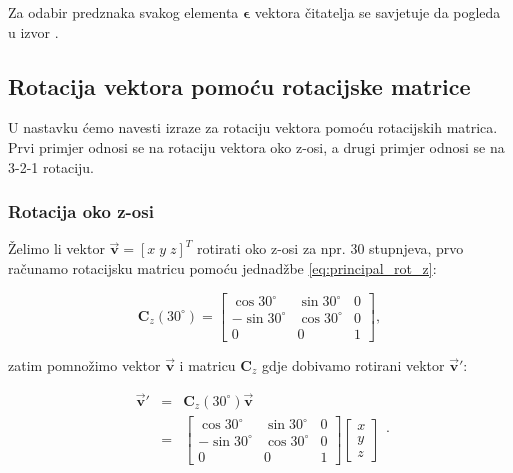 \documentclass[times, utf8, diplomski, numeric]{templates/template}
\begin{document}
{{{{                Za odabir predznaka svakog elementa $\boldsymbol\epsilon$ vektora čitatelja se savjetuje da pogleda u izvor \cite{adcsKnjiga}.
            }
        }

        \subsection{Rotacija vektora pomoću rotacijske matrice}{
            U nastavku ćemo navesti izraze za rotaciju vektora pomoću rotacijskih matrica. Prvi primjer odnosi se na rotaciju vektora oko z-osi, a drugi primjer odnosi se na 3-2-1 rotaciju.

            \subsubsection{Rotacija oko z-osi}{
                Želimo li vektor $\overrightarrow{\boldsymbol{v}}=\left[ x \; y \; z \right]^T$ rotirati oko z-osi za npr. 30 stupnjeva, prvo računamo rotacijsku matricu pomoću jednadžbe \ref{eq:principal_rot_z}:

                \begin{equation}
                \boldsymbol{C}_{z}(30^{\circ}) = 
                \begin{bmatrix}
                    \cos30^{\circ}   & \sin30^{\circ}    &  0 \\
                    -\sin30^{\circ}  & \cos30^{\circ}    &  0 \\
                    0                & 0                 &  1
                \end{bmatrix}
                ,
                \end{equation}

                zatim pomnožimo vektor $\overrightarrow{\boldsymbol{v}}$ i matricu $\boldsymbol{C}_{z}$ gdje dobivamo rotirani vektor $\overrightarrow{\boldsymbol{v}}'$:

                \begin{equation}
                \begin{array}{rcl}
                    \overrightarrow{\boldsymbol{v}}' & = & \boldsymbol{C}_{z}(30^{\circ}) \overrightarrow{\boldsymbol{v}} \\
                    & = &
                \begin{bmatrix}
                    \cos30^{\circ}   & \sin30^{\circ}    &  0 \\
                    -\sin30^{\circ}  & \cos30^{\circ}    &  0 \\
                    0                & 0                 &  1
                \end{bmatrix}
                \begin{bmatrix}
                    x \\
                    y \\
                    z
                \end{bmatrix}
                \end{array}
                .
                \end{equation}
            }

}}}
\end{document}
